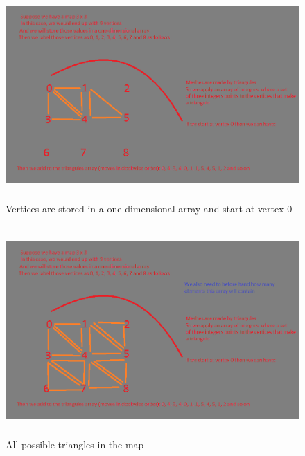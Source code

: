 \documentclass[a4paper,12pt]{book}
\begin{document}
\begin{figure}
\begin{center}
\includegraphics[height=80mm]{mesh_research_2.png}
\end{center}
\caption{Vertices are stored in a one-dimensional array and start at vertex 0}
\label{fig:pretty}
\end{figure}

\begin{figure}
\begin{center}
\includegraphics[height=80mm]{mesh_research_3.png}
\end{center}
\caption{All possible triangles in the map}
\label{fig:pretty}
\end{figure}
\end{document}
